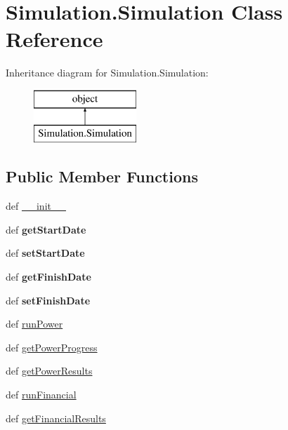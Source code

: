 \hypertarget{class_simulation_1_1_simulation}{\section{Simulation.\-Simulation Class Reference}
\label{class_simulation_1_1_simulation}
}
Inheritance diagram for Simulation.\-Simulation\-:\begin{figure}[H]
\begin{center}
\leavevmode
\includegraphics[height=2.000000cm]{class_simulation_1_1_simulation}
\end{center}
\end{figure}
\subsection*{Public Member Functions}
\begin{DoxyCompactItemize}
\item 
def \hyperlink{class_simulation_1_1_simulation_a92fe4b2ba01e196fc18858cfcc7f036a}{\-\_\-\-\_\-init\-\_\-\-\_\-}
\item 
\hypertarget{class_simulation_1_1_simulation_a6012c779af085e59bdd2c108b38a718c}{def {\bfseries get\-Start\-Date}}\label{class_simulation_1_1_simulation_a6012c779af085e59bdd2c108b38a718c}

\item 
\hypertarget{class_simulation_1_1_simulation_a5bbf84ff35f821aeee4cf140291c53f8}{def {\bfseries set\-Start\-Date}}\label{class_simulation_1_1_simulation_a5bbf84ff35f821aeee4cf140291c53f8}

\item 
\hypertarget{class_simulation_1_1_simulation_ac69a5cc59cbad1784e4f917aa2fdf93a}{def {\bfseries get\-Finish\-Date}}\label{class_simulation_1_1_simulation_ac69a5cc59cbad1784e4f917aa2fdf93a}

\item 
\hypertarget{class_simulation_1_1_simulation_ae90e33a0769c0a26f1ad38290a7c79b3}{def {\bfseries set\-Finish\-Date}}\label{class_simulation_1_1_simulation_ae90e33a0769c0a26f1ad38290a7c79b3}

\item 
def \hyperlink{class_simulation_1_1_simulation_a9a58fdcd85939da757ccc1208d93691c}{run\-Power}
\item 
def \hyperlink{class_simulation_1_1_simulation_af8635e13dd5c6e7cfb961a40cb53ecfb}{get\-Power\-Progress}
\item 
def \hyperlink{class_simulation_1_1_simulation_aa7029d830b6b70f49fdfef165eeb5913}{get\-Power\-Results}
\item 
def \hyperlink{class_simulation_1_1_simulation_aae9936c27dddf3fd47fbb3a5c397496a}{run\-Financial}
\item 
def \hyperlink{class_simulation_1_1_simulation_af81ab64710efe947c07440d838ef7fec}{get\-Financial\-Results}
\end{DoxyCompactItemize}
